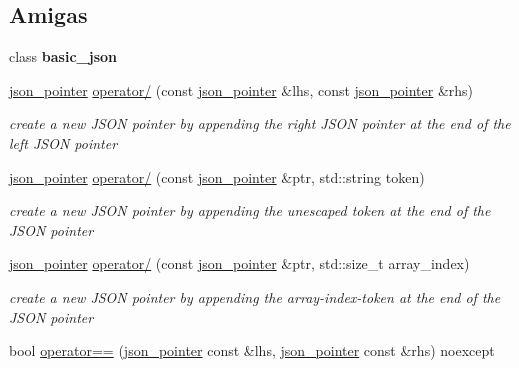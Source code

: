 \subsection*{Amigas}
\begin{DoxyCompactItemize}
\item 
\mbox{\label{classnlohmann_1_1json__pointer_ada3100cdb8700566051828f1355fa745}} 
class {\bfseries basic\+\_\+json}
\item 
\mbox{\hyperlink{classnlohmann_1_1json__pointer}{json\+\_\+pointer}} \mbox{\hyperlink{classnlohmann_1_1json__pointer_a90a11fe6c7f37b1746a3ff9cb24b0d53}{operator/}} (const \mbox{\hyperlink{classnlohmann_1_1json__pointer}{json\+\_\+pointer}} \&lhs, const \mbox{\hyperlink{classnlohmann_1_1json__pointer}{json\+\_\+pointer}} \&rhs)
\begin{DoxyCompactList}\small\item\em create a new J\+S\+ON pointer by appending the right J\+S\+ON pointer at the end of the left J\+S\+ON pointer \end{DoxyCompactList}\item 
\mbox{\hyperlink{classnlohmann_1_1json__pointer}{json\+\_\+pointer}} \mbox{\hyperlink{classnlohmann_1_1json__pointer_a926c9065dbed1bedc17857a813f7a46f}{operator/}} (const \mbox{\hyperlink{classnlohmann_1_1json__pointer}{json\+\_\+pointer}} \&ptr, std\+::string token)
\begin{DoxyCompactList}\small\item\em create a new J\+S\+ON pointer by appending the unescaped token at the end of the J\+S\+ON pointer \end{DoxyCompactList}\item 
\mbox{\hyperlink{classnlohmann_1_1json__pointer}{json\+\_\+pointer}} \mbox{\hyperlink{classnlohmann_1_1json__pointer_a9f6bc6f4d4668b4e9a19d8b8ac29da4f}{operator/}} (const \mbox{\hyperlink{classnlohmann_1_1json__pointer}{json\+\_\+pointer}} \&ptr, std\+::size\+\_\+t array\+\_\+index)
\begin{DoxyCompactList}\small\item\em create a new J\+S\+ON pointer by appending the array-\/index-\/token at the end of the J\+S\+ON pointer \end{DoxyCompactList}\item 
bool \mbox{\hyperlink{classnlohmann_1_1json__pointer_a4667ef558c8c3f8a646bfda0c6654653}{operator==}} (\mbox{\hyperlink{classnlohmann_1_1json__pointer}{json\+\_\+pointer}} const \&lhs, \mbox{\hyperlink{classnlohmann_1_1json__pointer}{json\+\_\+pointer}} const \&rhs) noexcept

\end{DoxyCompactItemize}
